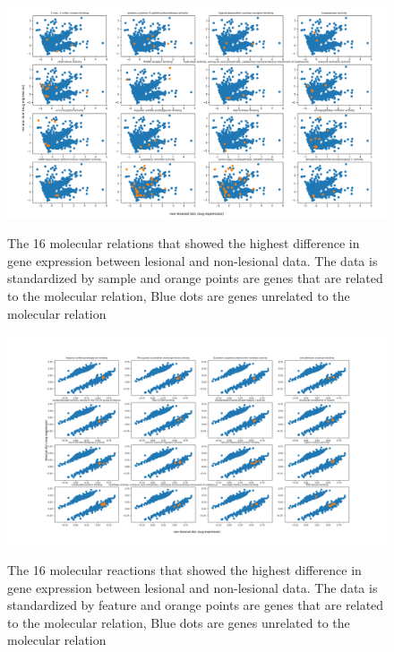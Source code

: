 \documentclass[10pt,a4paper]{article}
\begin{document}
	\begin{figure}[H]
		\includegraphics[width=1\textwidth]{Sign_Molecular_Psoriasis.png}
		\label{fig:MolecularScaledBySample}
		\caption{The 16 molecular relations that showed the highest difference in gene expression between lesional and non-lesional data. The data is standardized by sample and orange points are genes that are related to the molecular relation, Blue dots are genes unrelated to the molecular relation}
	\end{figure}
	
	\begin{figure}[H]
		\includegraphics[width=1\textwidth]{Sign_Molecular_Psoriasis_Scaled.png}
		\label{fig:MolecularScaledByFeature1}
		\caption{The 16 molecular reactions that showed the highest difference in gene expression between lesional and non-lesional data. The data is standardized by feature and orange points are genes that are related to the molecular relation, Blue dots are genes unrelated to the molecular relation}
	\end{figure}


	
\end{document}

